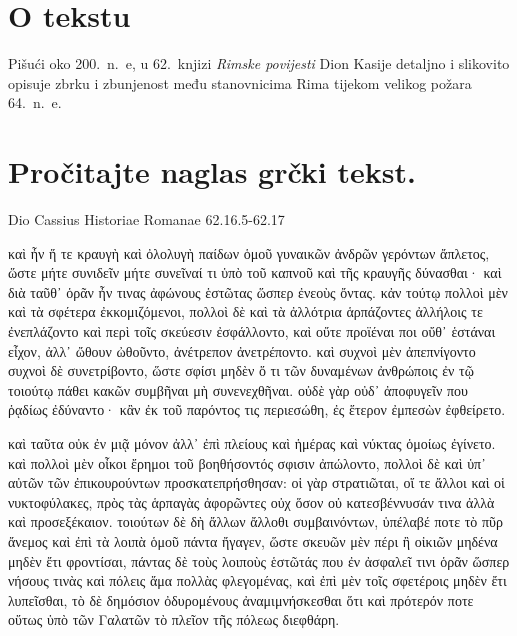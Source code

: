 


\section*{O tekstu}

Pišući oko 200.\ n.~e, u 62.\ knjizi \textit{Rimske povijesti} Dion Kasije detaljno i slikovito opisuje zbrku i zbunjenost među stanovnicima Rima tijekom velikog požara 64.\ n.~e.


\section*{Pročitajte naglas grčki tekst.}

Dio Cassius Historiae Romanae 62.16.5-62.17

\medskip


{\large

\begin{greek}

\noindent καὶ ἦν ἥ τε κραυγὴ καὶ ὀλολυγὴ παίδων ὁμοῦ γυναικῶν ἀνδρῶν γερόντων ἄπλετος, ὥστε μήτε συνιδεῖν μήτε συνεῖναί τι ὑπὸ τοῦ καπνοῦ καὶ τῆς κραυγῆς δύνασθαι· καὶ διὰ ταῦθ᾽ ὁρᾶν ἦν τινας ἀφώνους ἑστῶτας ὥσπερ ἐνεοὺς ὄντας. κἀν τούτῳ πολλοὶ μὲν καὶ τὰ σφέτερα ἐκκομιζόμενοι, πολλοὶ δὲ καὶ τὰ ἀλλότρια ἁρπάζοντες ἀλλήλοις τε ἐνεπλάζοντο καὶ περὶ τοῖς σκεύεσιν ἐσφάλλοντο, καὶ οὔτε προϊέναι ποι οὔθ᾽ ἑστάναι εἶχον, ἀλλ᾽ ὤθουν ὠθοῦντο, ἀνέτρεπον ἀνετρέποντο. καὶ συχνοὶ μὲν ἀπεπνίγοντο συχνοὶ δὲ συνετρίβοντο, ὥστε σφίσι μηδὲν ὅ τι τῶν δυναμένων ἀνθρώποις ἐν τῷ τοιούτῳ πάθει κακῶν συμβῆναι μὴ συνενεχθῆναι. οὐδὲ γὰρ οὐδ᾽ ἀποφυγεῖν που ῥᾳδίως ἐδύναντο· κἂν ἐκ τοῦ παρόντος τις περιεσώθη, ἐς ἕτερον ἐμπεσὼν ἐφθείρετο.

\noindent καὶ ταῦτα οὐκ ἐν μιᾷ μόνον ἀλλ᾽ ἐπὶ πλείους καὶ ἡμέρας καὶ νύκτας ὁμοίως ἐγίνετο. καὶ πολλοὶ μὲν οἶκοι ἔρημοι τοῦ βοηθήσοντός σφισιν ἀπώλοντο, πολλοὶ δὲ καὶ ὑπ᾽ αὐτῶν τῶν ἐπικουρούντων προσκατεπρήσθησαν: οἱ γὰρ στρατιῶται, οἵ τε ἄλλοι καὶ οἱ νυκτοφύλακες, πρὸς τὰς ἁρπαγὰς ἀφορῶντες οὐχ ὅσον οὐ κατεσβέννυσάν τινα ἀλλὰ καὶ προσεξέκαιον. τοιούτων δὲ δὴ ἄλλων ἄλλοθι συμβαινόντων, ὑπέλαβέ ποτε τὸ πῦρ ἄνεμος καὶ ἐπὶ τὰ λοιπὰ ὁμοῦ πάντα ἤγαγεν, ὥστε σκευῶν μὲν πέρι ἢ οἰκιῶν μηδένα μηδὲν ἔτι φροντίσαι, πάντας δὲ τοὺς λοιποὺς ἑστῶτάς που ἐν ἀσφαλεῖ τινι ὁρᾶν ὥσπερ νήσους τινὰς καὶ πόλεις ἅμα πολλὰς φλεγομένας, καὶ ἐπὶ μὲν τοῖς σφετέροις μηδὲν ἔτι λυπεῖσθαι, τὸ δὲ δημόσιον ὀδυρομένους ἀναμιμνήσκεσθαι ὅτι καὶ πρότερόν ποτε οὕτως ὑπὸ τῶν Γαλατῶν τὸ πλεῖον τῆς πόλεως διεφθάρη.

\end{greek}

}

